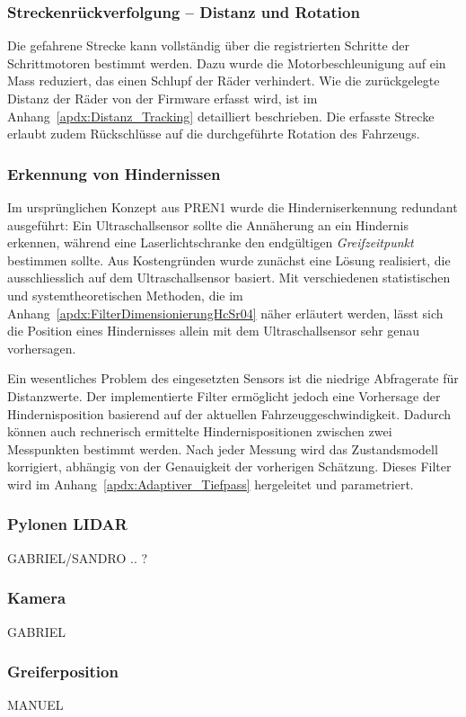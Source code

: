 \documentclass[main.tex]{subfiles} %
\begin{document}


\subsubsection*{Streckenrückverfolgung – Distanz und Rotation}

Die gefahrene Strecke kann vollständig über die registrierten Schritte der
Schrittmotoren bestimmt werden. Dazu wurde die Motorbeschleunigung auf ein Mass
reduziert, das einen Schlupf der Räder verhindert. Wie die zurückgelegte
Distanz der Räder von der Firmware erfasst wird, ist im
Anhang~\ref{apdx:Distanz_Tracking} detailliert beschrieben. Die erfasste
Strecke erlaubt zudem Rückschlüsse auf die durchgeführte Rotation des
Fahrzeugs.

\subsubsection*{Erkennung von Hindernissen}

Im ursprünglichen Konzept aus PREN1 wurde die Hinderniserkennung redundant
ausgeführt: Ein Ultraschallsensor sollte die Annäherung an ein Hindernis
erkennen, während eine Laserlichtschranke den endgültigen
\textit{Greifzeitpunkt} bestimmen sollte. Aus Kostengründen wurde zunächst eine
Lösung realisiert, die ausschliesslich auf dem Ultraschallsensor basiert. Mit
verschiedenen statistischen und systemtheoretischen Methoden, die im
Anhang~\ref{apdx:FilterDimensionierungHcSr04} näher erläutert werden, lässt
sich die Position eines Hindernisses allein mit dem Ultraschallsensor sehr
genau vorhersagen.

Ein wesentliches Problem des eingesetzten Sensors ist die niedrige Abfragerate
für Distanzwerte. Der implementierte Filter ermöglicht jedoch eine Vorhersage
der Hindernisposition basierend auf der aktuellen Fahrzeuggeschwindigkeit.
Dadurch können auch rechnerisch ermittelte Hindernispositionen zwischen zwei
Messpunkten bestimmt werden. Nach jeder Messung wird das Zustandsmodell
korrigiert, abhängig von der Genauigkeit der vorherigen Schätzung. Dieses
Filter wird im Anhang~\ref{apdx:Adaptiver_Tiefpass} hergeleitet und
parametriert.


\subsubsection*{Pylonen LIDAR}

GABRIEL/SANDRO .. ?

\subsubsection*{Kamera}

GABRIEL

\subsubsection*{Greiferposition}

MANUEL
\end{document}
